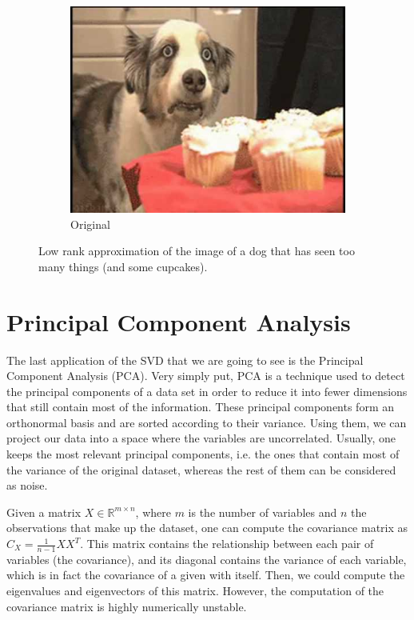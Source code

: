 \documentclass[11pt,a4paper]{article}
\begin{document}
\begin{figure}[H]
\begin{subfigure}[t]{.5\textwidth}
    \includegraphics[scale=0.3]{img/me_in_nla}
    \caption{Original}
  \end{subfigure}%
  \caption{Low rank approximation of the image of a dog that has seen too many things (and some cupcakes).}
  \label{fig:dog-lr-approximation}
\end{figure}


\section{Principal Component Analysis}

The last application of the SVD that we are going to see is the Principal Component Analysis (PCA).
Very simply put, PCA is a technique used to detect the principal components of a data set in order to
reduce it into fewer dimensions that still contain most of the information. These principal components
form an orthonormal basis and are sorted according to their variance. Using them, we can project our data
into a space where the variables are uncorrelated. Usually, one keeps the most relevant principal components,
i.e. the ones that contain most of the variance of the original dataset, whereas the rest of them can be
considered as noise.

Given a matrix $X \in \mathbb{R}^{m \times n}$, where $m$ is the number of variables and $n$ the observations
that make up the dataset, one can compute the covariance matrix as $C_X = \frac{1}{n-1} XX^T$. This
matrix contains the relationship between each pair of variables (the covariance), and its diagonal contains
the variance of each variable, which is in fact the covariance of a given with itself. Then, we
could compute the eigenvalues and eigenvectors of this matrix. However, the computation of the covariance matrix
is highly numerically unstable.
\end{document}
